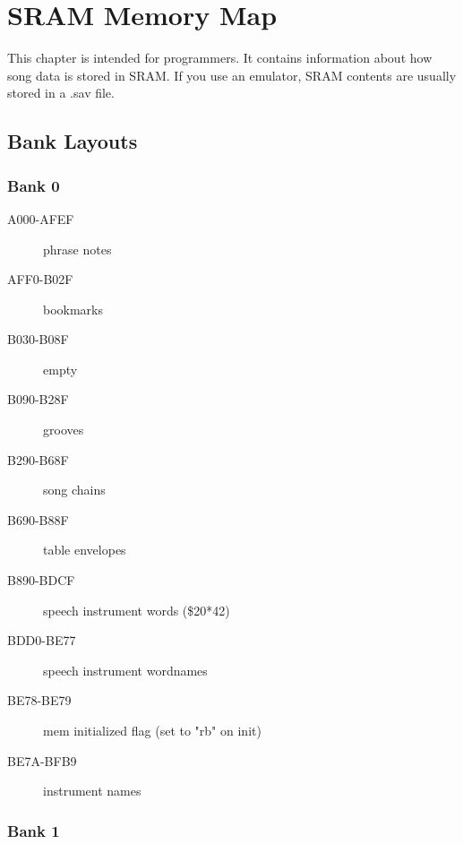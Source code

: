 \chapter{SRAM Memory Map}

This chapter is intended for programmers. It contains information about how song data is stored in SRAM. If you use an emulator, SRAM contents are usually stored in a .sav file.

\section{Bank Layouts}

\subsection{Bank 0}

\begin{description}
    \item[A000-AFEF] phrase notes
    \item[AFF0-B02F] bookmarks
    \item[B030-B08F] empty
    \item[B090-B28F] grooves
    \item[B290-B68F] song chains
    \item[B690-B88F] table envelopes
    \item[B890-BDCF] speech instrument words (\$20*42)
    \item[BDD0-BE77] speech instrument wordnames
    \item[BE78-BE79] mem initialized flag (set to "rb" on init)
    \item[BE7A-BFB9] instrument names
\end{description}

\subsection{Bank 1}

